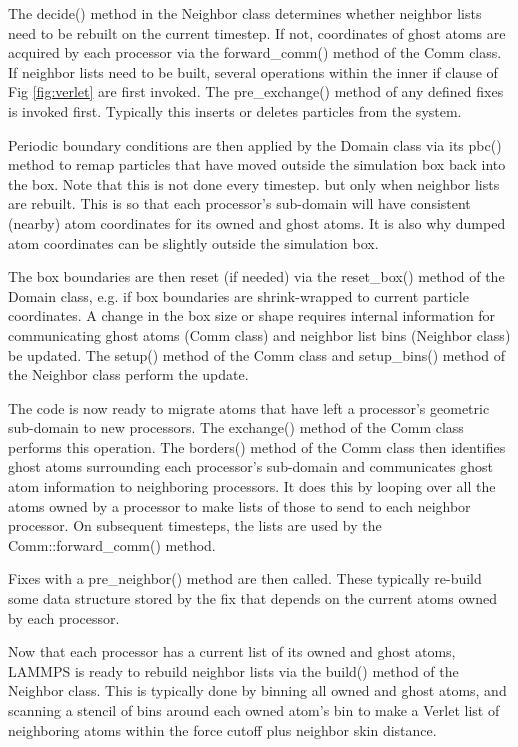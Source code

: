 \documentclass{article}
\begin{document}
The decide() method in the Neighbor class determines whether neighbor
lists need to be rebuilt on the current timestep.  If not, coordinates
of ghost atoms are acquired by each processor via the forward\_comm()
method of the Comm class.  If neighbor lists need to be built, several
operations within the inner if clause of Fig \ref{fig:verlet} are
first invoked.  The pre\_exchange() method of any defined fixes is
invoked first.  Typically this inserts or deletes particles from the
system.

Periodic boundary conditions are then applied by the Domain class via
its pbc() method to remap particles that have moved outside the
simulation box back into the box.  Note that this is not done every
timestep. but only when neighbor lists are rebuilt.  This is so that
each processor's sub-domain will have consistent (nearby) atom
coordinates for its owned and ghost atoms.  It is also why dumped atom
coordinates can be slightly outside the simulation box.

The box boundaries are then reset (if needed) via the reset\_box()
method of the Domain class, e.g. if box boundaries are shrink-wrapped
to current particle coordinates.  A change in the box size or shape
requires internal information for communicating ghost atoms (Comm
class) and neighbor list bins (Neighbor class) be updated.  The
setup() method of the Comm class and setup\_bins() method of the
Neighbor class perform the update.

The code is now ready to migrate atoms that have left a processor's
geometric sub-domain to new processors.  The exchange() method of the
Comm class performs this operation.  The borders() method of the Comm
class then identifies ghost atoms surrounding each processor's
sub-domain and communicates ghost atom information to neighboring
processors.  It does this by looping over all the atoms owned by a
processor to make lists of those to send to each neighbor processor.
On subsequent timesteps, the lists are used by the
Comm::forward\_comm() method.

Fixes with a pre\_neighbor() method are then called.  These typically
re-build some data structure stored by the fix that depends on the
current atoms owned by each processor.

Now that each processor has a current list of its owned and ghost
atoms, LAMMPS is ready to rebuild neighbor lists via the build()
method of the Neighbor class.  This is typically done by binning all
owned and ghost atoms, and scanning a stencil of bins around each
owned atom's bin to make a Verlet list of neighboring atoms within the
force cutoff plus neighbor skin distance.
\end{document}
